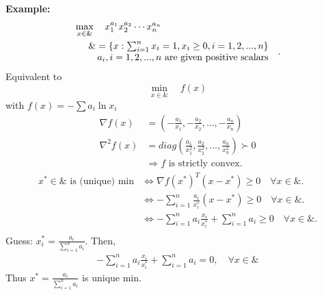 \documentclass[11pt,a4paper]{article}
\begin{document}
\textbf{Example:}
\begin{align*}
    &\max_{x\in\&}\quad x_1^{a_1}x_2^{a_2}\cdots x_n^{a_n}\\
    &\begin{array}{r@{\quad}r@{}l@{\quad}l}
    &\&=\{x:\sum_{i=1}^nx_i=1,x_i\geq 0,i=1,2,...,n\} &\\
    &a_i,i=1,2,...,n \text{ are given positive scalars}&\\
\end{array} .
\end{align*}
Equivalent to $$\min_{x\in\&}\quad f(x)$$ with $f(x)=-\sum a_i\ln x_i$
\begin{equation}
    \begin{aligned}
        \nabla f(x)&=\left(-\frac{a_1}{x_1},-\frac{a_2}{x_2},...,-\frac{a_n}{x_n}\right)\\
        \nabla^2 f(x)&=diag\left(\frac{a_1}{x^2_1},\frac{a_2}{x^2_2},...,\frac{a_n}{x^2_n}\right)\succ 0\\
        &\Rightarrow f\text{ is strictly convex}.
    \end{aligned}
    \nonumber
\end{equation}
\begin{equation}
    \begin{aligned}
        x^*\in\&\text{ is (unique) min}&\Leftrightarrow \nabla f(x^*)^T(x-x^*)\geq 0\quad \forall x\in\&.\\
        &\Leftrightarrow -\sum_{i=1}^n\frac{a_i}{x_i^*}(x-x^*)\geq 0\quad \forall x\in\&.\\
        &\Leftrightarrow -\sum_{i=1}^na_i\frac{x_i}{x_i^*}+\sum_{i=1}^na_i\geq 0\quad \forall x\in\&.\\
    \end{aligned}
    \nonumber
\end{equation}
Guess: $x^*_i=\frac{a_i}{\sum_{i=1}^na_i}$. Then,
\begin{equation}
    \begin{aligned}
        -\sum_{i=1}^n a_i\frac{x_i}{x_i^*}+\sum_{i=1}^na_i=0,\quad \forall x\in\&
    \end{aligned}
    \nonumber
\end{equation}
Thus $x^*=\frac{a_i}{\sum_{i=1}^na_i}$ is unique min.
\end{document}
